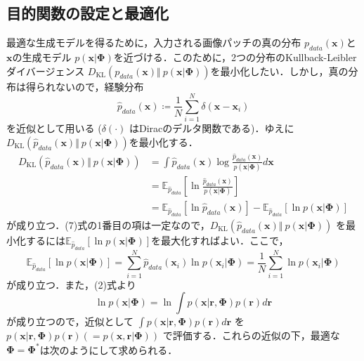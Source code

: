 \subsection{目的関数の設定と最適化}
最適な生成モデルを得るために，入力される画像パッチの真の分布 $p_{data}(\mathbf{x})$と$\mathbf{x}$の生成モデル $p(\mathbf{x}|\mathbf{\Phi})$を近づける．このために，2つの分布のKullback-Leibler ダイバージェンス $D_{\text{KL}}\left(p_{data}(\mathbf{x}) \Vert\ p(\mathbf{x}|\mathbf{\Phi})\right)$を最小化したい．しかし，真の分布は得られないので，経験分布 
\begin{equation}
\hat{p}_{data}(\mathbf{x})\coloneqq\frac{1}{N}\sum_{i=1}^N \delta(\mathbf{x}-\mathbf{x}_i)
\end{equation}
を近似として用いる ($\delta(\cdot)$ はDiracのデルタ関数である)．ゆえに$D_{\text{KL}}\left(\hat{p}_{data}(\mathbf{x}) \Vert\ p(\mathbf{x}|\mathbf{\Phi})\right)$を最小化する．
\begin{align}
D_{\text{KL}}\left(\hat{p}_{data}(\mathbf{x}) \Vert\ p(\mathbf{x}|\mathbf{\Phi})\right)&=\int \hat{p}_{data}(\mathbf{x}) \log \frac{\hat{p}_{data}(\mathbf{x})}{p(\mathbf{x}|\mathbf{\Phi})} d\mathbf{x}\\
&=\mathbb{E}_{\hat{p}_{data}} \left[\ln \frac{\hat{p}_{data}(\mathbf{x})}{p(\mathbf{x}|\mathbf{\Phi})}\right]\\
&=\mathbb{E}_{\hat{p}_{data}} \left[\ln \hat{p}_{data}(\mathbf{x})\right]-\mathbb{E}_{\hat{p}_{data}} \left[\ln p(\mathbf{x}|\mathbf{\Phi})\right]
\end{align}
が成り立つ．(7)式の1番目の項は一定なので，$D_{\text{KL}}\left(\hat{p}_{data}(\mathbf{x}) \Vert\ p(\mathbf{x}|\mathbf{\Phi})\right)$ を最小化するには$\mathbb{E}_{\hat{p}_{data}} \left[\ln p(\mathbf{x}|\mathbf{\Phi})\right]$を最大化すればよい．ここで，
\begin{equation}
\mathbb{E}_{\hat{p}_{data}} \left[\ln p(\mathbf{x}|\mathbf{\Phi})\right]=\sum_{i=1}^N \hat{p}_{data}(\mathbf{x}_i)\ln p(\mathbf{x}_i|\mathbf{\Phi})=\frac{1}{N}\sum_{i=1}^N \ln p(\mathbf{x}_i|\mathbf{\Phi})
\end{equation}
が成り立つ．また，(2)式より
\begin{equation}
\ln p(\mathbf{x}|\mathbf{\Phi})=\ln \int p(\mathbf{x}|\mathbf{r}, \mathbf{\Phi})p(\mathbf{r})d\mathbf{r}
\end{equation}
が成り立つので，近似として $\displaystyle \int p(\mathbf{x}|\mathbf{r}, \mathbf{\Phi})p(\mathbf{r})d\mathbf{r}$ を $p(\mathbf{x}|\mathbf{r}, \mathbf{\Phi})p(\mathbf{r}) \left(=p(\mathbf{x}, \mathbf{r}| \mathbf{\Phi})\right)$ で評価する．これらの近似の下，最適な$\mathbf{\Phi}=\mathbf{\Phi}^*$は次のようにして求められる．
